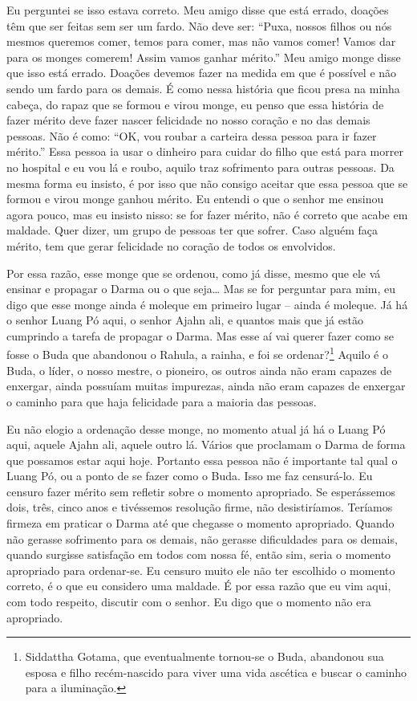Eu perguntei se isso estava correto. Meu amigo disse que está
errado, doações têm que ser feitas sem ser um fardo. Não deve ser:
“Puxa, nossos filhos ou nós mesmos queremos comer, temos para comer,
mas não vamos comer! Vamos dar para os monges comerem! Assim vamos
ganhar mérito.” Meu amigo monge disse que isso está errado. Doações
devemos fazer na medida em que é possível e não sendo um fardo para os
demais. É como nessa história que ficou presa na minha cabeça, do rapaz
que se formou e virou monge, eu penso que essa história de fazer mérito
deve fazer nascer felicidade no nosso coração e no das demais pessoas.
Não é como: “OK, vou roubar a carteira dessa pessoa para ir fazer
mérito.” Essa pessoa ia usar o dinheiro para cuidar do filho que está
para morrer no hospital e eu vou lá e roubo, aquilo traz sofrimento
para outras pessoas. Da mesma forma eu insisto, é por isso que não
consigo aceitar que essa pessoa que se formou e virou monge ganhou
mérito. Eu entendi o que o senhor me ensinou agora pouco, mas eu
insisto nisso: se for fazer mérito, não é correto que acabe em maldade.
Quer dizer, um grupo de pessoas ter que sofrer. Caso alguém faça
mérito, tem que gerar felicidade no coração de todos os envolvidos. 

Por essa razão, esse monge que se ordenou, como já disse, mesmo que
ele vá ensinar e propagar o Darma ou o que seja… Mas se for perguntar
para mim, eu digo que esse monge ainda é moleque em primeiro lugar –
ainda é moleque. Já há o senhor Luang Pó aqui, o senhor Ajahn ali, e
quantos mais que já estão cumprindo a tarefa de propagar o Darma. Mas
esse aí vai querer fazer como se fosse o Buda que abandonou o Rahula, a
rainha, e foi se ordenar?\footnote{Siddattha Gotama, que eventualmente
tornou-se o Buda, abandonou sua esposa e filho recém-nascido para viver
uma vida ascética e buscar o caminho para a iluminação.} Aquilo é o
Buda, o líder, o nosso mestre, o pioneiro, os outros ainda não eram
capazes de enxergar, ainda possuíam muitas impurezas, ainda não eram
capazes de enxergar o caminho para que haja felicidade para a maioria
das pessoas. 

Eu não elogio a ordenação desse monge, no momento atual já há o
Luang Pó aqui, aquele Ajahn ali, aquele outro lá. Vários que proclamam
o Darma de forma que possamos estar aqui hoje. Portanto essa pessoa não
é importante tal qual o Luang Pó, ou a ponto de se fazer como o Buda.
Isso me faz censurá-lo. Eu censuro fazer mérito sem refletir sobre o
momento apropriado. Se esperássemos dois, três, cinco anos e tivéssemos
resolução firme, não desistiríamos. Teríamos firmeza em praticar o
Darma até que chegasse o momento apropriado. Quando não gerasse
sofrimento para os demais, não gerasse dificuldades para os demais,
quando surgisse satisfação em todos com nossa fé, então sim, seria o
momento apropriado para ordenar-se. Eu censuro muito ele não ter
escolhido o momento correto, é o que eu considero uma maldade. É por
essa razão que eu vim aqui, com todo respeito, discutir com o senhor.
Eu digo que o momento não era apropriado.

